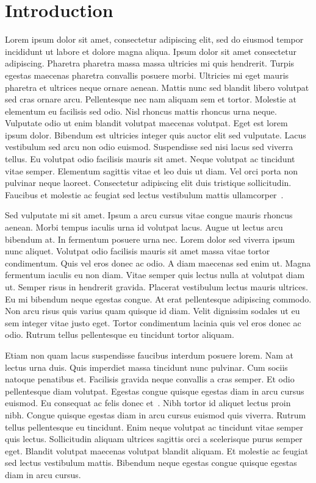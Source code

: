 \section{Introduction}

Lorem ipsum dolor sit amet, consectetur adipiscing elit, sed do eiusmod tempor
incididunt ut labore et dolore magna aliqua. Ipsum dolor sit amet consectetur
adipiscing. Pharetra pharetra massa massa ultricies mi quis hendrerit. Turpis
egestas maecenas pharetra convallis posuere morbi. Ultricies mi eget mauris
pharetra et ultrices neque ornare aenean. Mattis nunc sed blandit libero
volutpat sed cras ornare arcu. Pellentesque nec nam aliquam sem et tortor.
Molestie at elementum eu facilisis sed odio. Nisl rhoncus mattis rhoncus urna
neque. Vulputate odio ut enim blandit volutpat maecenas volutpat. Eget est
lorem ipsum dolor. Bibendum est ultricies integer quis auctor elit sed
vulputate. Lacus vestibulum sed arcu non odio euismod. Suspendisse sed nisi
lacus sed viverra tellus. Eu volutpat odio facilisis mauris sit amet. Neque
volutpat ac tincidunt vitae semper. Elementum sagittis vitae et leo duis ut
diam. Vel orci porta non pulvinar neque laoreet. Consectetur adipiscing elit
duis tristique sollicitudin. Faucibus et molestie ac feugiat sed lectus
vestibulum mattis
ullamcorper~\cite{Appa+:crypto18,Deere+:eprint12,Spencer+:jacm06}.\par

Sed vulputate mi sit amet. Ipsum a arcu cursus vitae congue mauris rhoncus
aenean. Morbi tempus iaculis urna id volutpat lacus. Augue ut lectus arcu
bibendum at. In fermentum posuere urna nec. Lorem dolor sed viverra ipsum nunc
aliquet. Volutpat odio facilisis mauris sit amet massa vitae tortor
condimentum. Quis vel eros donec ac odio. A diam maecenas sed enim ut. Magna
fermentum iaculis eu non diam. Vitae semper quis lectus nulla at volutpat diam
ut. Semper risus in hendrerit gravida. Placerat vestibulum lectus mauris
ultrices. Eu mi bibendum neque egestas congue. At erat pellentesque adipiscing
commodo. Non arcu risus quis varius quam quisque id diam. Velit dignissim
sodales ut eu sem integer vitae justo eget. Tortor condimentum lacinia quis vel
eros donec ac odio. Rutrum tellus pellentesque eu tincidunt tortor aliquam.\par

Etiam non quam lacus suspendisse faucibus interdum posuere lorem. Nam at lectus
urna duis. Quis imperdiet massa tincidunt nunc pulvinar. Cum sociis natoque
penatibus et. Facilisis gravida neque convallis a cras semper. Et odio
pellentesque diam volutpat. Egestas congue quisque egestas diam in arcu cursus
euismod. Eu consequat ac felis donec et~\cite{Deere+:eprint12}. Nibh tortor id
aliquet lectus proin nibh. Congue quisque egestas diam in arcu cursus euismod
quis viverra. Rutrum tellus pellentesque eu tincidunt. Enim neque volutpat ac
tincidunt vitae semper quis lectus. Sollicitudin aliquam ultrices sagittis orci
a scelerisque purus semper eget. Blandit volutpat maecenas volutpat blandit
aliquam. Et molestie ac feugiat sed lectus vestibulum mattis. Bibendum neque
egestas congue quisque egestas diam in arcu cursus.\par

